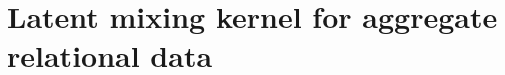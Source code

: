 \documentclass[12pt,openright,oneside,letterpaper,onecolumn]{report}
\begin{document}
\chapter{Latent mixing kernel for aggregate relational data}
\label{chap:kernel}











\begin{appendices}


\end{appendices}
\end{document}
